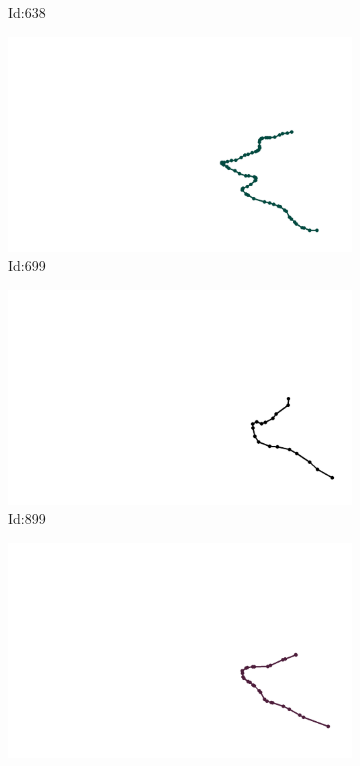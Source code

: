 \documentclass[12pt,twoside]{report}
\begin{document}
\begin{figure}
\begin{subfigure}[b]{0.20\textwidth}
\caption{Id:638}
\end{subfigure}
\begin{subfigure}[b]{0.20\textwidth}
\centering
\includegraphics[width=\textwidth]{../../trajectories/699.png}
\caption{Id:699}
\end{subfigure}
\begin{subfigure}[b]{0.20\textwidth}
\centering
\includegraphics[width=\textwidth]{../../trajectories/899.png}
\caption{Id:899}
\end{subfigure}
\begin{subfigure}[b]{0.20\textwidth}
\centering
\includegraphics[width=\textwidth]{../../trajectories/984.png}

\end{subfigure}
\end{figure}
\end{document}
